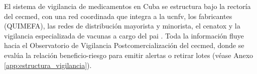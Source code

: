 


El sistema de vigilancia de medicamentos en Cuba se estructura bajo la rectoría del \gls{cecmed}, con una red coordinada que integra a la \gls{ucnfv}, los fabricantes (QUIMEFA), las redes de distribución mayorista y minorista, el \gls{cenatox} y la vigilancia especializada de vacunas a cargo del \gls{pai} \cite{paho_vigilancia_medicamentos_cuba}. 
Toda la información fluye hacia el Observatorio de Vigilancia Postcomercialización del \gls{cecmed}, donde se evalúa la relación beneficio-riesgo para emitir alertas o retirar lotes (véase Anexo \ref{app:estructura_vigilancia}).


